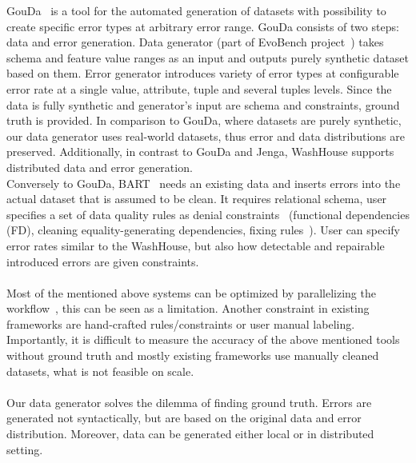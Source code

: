 GouDa~\cite{gouda} is a tool for the automated generation of datasets with possibility to create specific error types at arbitrary error range.
GouDa consists of two steps: data and error generation.
Data generator (part of EvoBench project~\cite{evobench}) takes schema and feature value ranges as an input and outputs purely synthetic dataset based on them. 
Error generator introduces variety of error types at configurable error rate at a single value, attribute, tuple and several tuples levels. Since the data is fully synthetic and generator's input are schema and constraints, ground truth is provided. 
In comparison to GouDa, where datasets are purely synthetic, our data generator uses real-world datasets, thus error and data distributions are preserved. 
Additionally, in contrast to GouDa and Jenga, WashHouse supports distributed data and error generation.\\
Conversely to GouDa, BART~\cite{bart} needs an existing data and inserts errors into the actual dataset that is assumed to be clean. It requires relational schema, user specifies
a set of data quality rules as denial constraints~\cite{denialconst} (functional dependencies (FD), cleaning equality-generating dependencies, fixing rules~\cite{fixingrules}). 
User can specify error rates similar to the WashHouse, but also how detectable and repairable introduced errors are given constraints.\\\\
Most of the mentioned above systems can be optimized by parallelizing the workflow~\cite{raha, baran, holoclean, holodetect, gouda, jenga}, this can be seen as a limitation.
Another constraint in existing frameworks are hand-crafted rules/constraints or user manual labeling.
Importantly, it is difficult to measure the accuracy of the above mentioned tools without ground truth and mostly existing frameworks use manually cleaned datasets, what is not feasible on scale.
\\\\
Our data generator solves the dilemma of finding ground truth. Errors are generated not syntactically, but are based on the original data and error distribution.
Moreover, data can be generated either local or in distributed setting.

